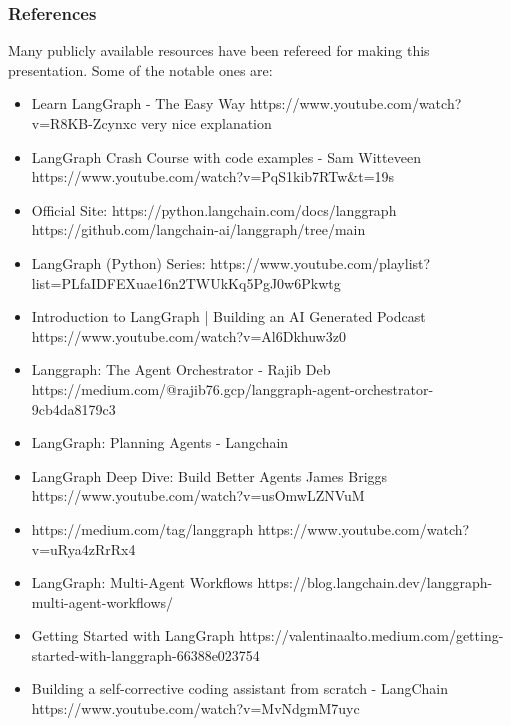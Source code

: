 \begin{frame}\frametitle{References}
Many publicly available resources have been refereed for making this presentation. Some of the notable ones are:
\footnotesize
\begin{itemize}
\item Learn LangGraph - The Easy Way https://www.youtube.com/watch?v=R8KB-Zcynxc very nice explanation
\item LangGraph Crash Course with code examples - Sam Witteveen https://www.youtube.com/watch?v=PqS1kib7RTw&t=19s
\item Official Site: https://python.langchain.com/docs/langgraph https://github.com/langchain-ai/langgraph/tree/main
\item LangGraph (Python) Series: https://www.youtube.com/playlist?list=PLfaIDFEXuae16n2TWUkKq5PgJ0w6Pkwtg
\item Introduction to LangGraph | Building an AI Generated Podcast https://www.youtube.com/watch?v=Al6Dkhuw3z0
\item Langgraph: The Agent Orchestrator - Rajib Deb https://medium.com/@rajib76.gcp/langgraph-agent-orchestrator-9cb4da8179c3
\item LangGraph: Planning Agents - Langchain 
\item LangGraph Deep Dive: Build Better Agents James Briggs https://www.youtube.com/watch?v=usOmwLZNVuM
\item https://medium.com/tag/langgraph https://www.youtube.com/watch?v=uRya4zRrRx4
\item LangGraph: Multi-Agent Workflows https://blog.langchain.dev/langgraph-multi-agent-workflows/
\item Getting Started with LangGraph https://valentinaalto.medium.com/getting-started-with-langgraph-66388e023754
\item Building a self-corrective coding assistant from scratch - LangChain https://www.youtube.com/watch?v=MvNdgmM7uyc
\end{itemize}

\end{frame}